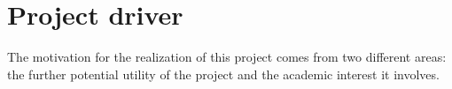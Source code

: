 \begin{comment}
				For this goal an USB-capable board equipped with an MSP430 microcontroller was chosen for acting
				as the receiver accessory. More specifically, this microcontroller would be running FreeRTOS
				(operating system oriented to tasks with real-time needs), which would be accordingly modified
				for dealing with the USB interface and 802.15.4 communication.\\
				It is also noteworthy that the usage of a prototyping board and a potential miniaturisation of
				the previously described board were included into the scope of this objective as well. Besides, 
				full description and more details about this development and 802.15.4 communication can be found 
				at \autoref{ch:hardware}, \nameref{ch:hardware}.\\
			\item \emph{Android ECG application}\\
				Finally, an Android application acts as the system's frontend. Its most relevant requirements were
				determined by the existing EPFL iOS application, with subtle modifications due to the different
				platform as well as the inclusion of an extra accessory.\\
				The data the application displays, in the shape of ECG waves, may be retrieved from a Bluetooth
				or 802.15.4 streaming node or a local log file. These logs are written by the application itself
				as it receives an incoming data transmission, so that it can replay them later --original
				iOS application lacked this feature--.\\
				Moreover, view controls shall also be offered for the user to modify display density, and move
				forwards and backwards if a log is being displayed.\\
				More information about the application, such as requirements and other details, can be found
				at \autoref{ch:swdev}, \nameref{ch:swdev}.\\
		\end{enumerate}
		\end{comment}
		
	\section{Project driver}
	\label{sec:prj-driver}

		The motivation for the realization of this project comes from two different areas: the further potential utility of the project and the academic interest it involves.\\

